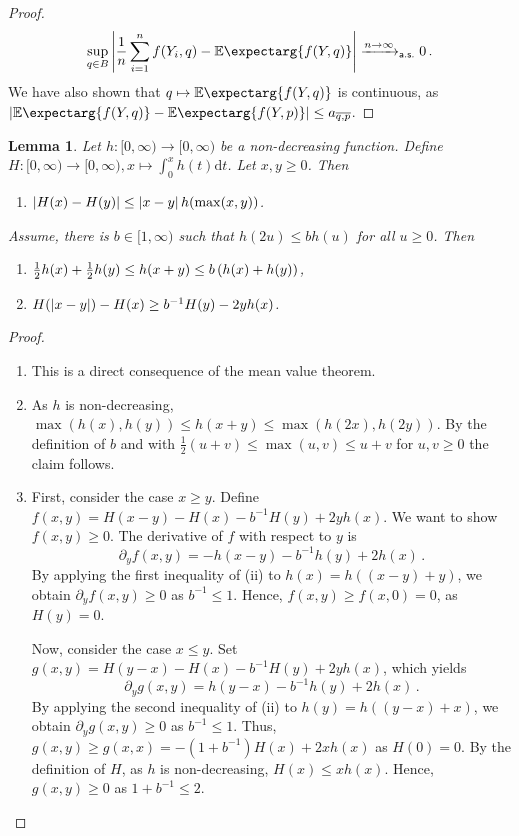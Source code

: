 \documentclass{scrartcl}
\newcommand{\Ex}{\E\expectarg}
\newcommand*{\ms}[1]{\mathsf{#1}}
\newcommand{\dl}{\mathrm{d}}
\newcommand{\equationFullstop}{\, .}
\newcommand{\eqfs}{\equationFullstop}
\newcommand{\sol}[2]{\overline{#1,#2}}
\theoremstyle{plain}\newtheorem{theorem}{Theorem}[section]
\newtheorem{lemma}[theorem]{Lemma}
\theoremstyle{definition}
\theoremstyle{remark}
\providecommand{\DIFaddtex}[1]{{\protect\color{blue}\uwave{#1}}} %
\providecommand{\DIFdeltex}[1]{{\protect\color{red}\sout{#1}}}                      %
\providecommand{\DIFaddbegin}{} %
\providecommand{\DIFaddend}{} %
\providecommand{\DIFdelbegin}{} %
\providecommand{\DIFdelend}{} %
\providecommand{\DIFadd}[1]{\texorpdfstring{\DIFaddtex{#1}}{#1}} %
\providecommand{\DIFdel}[1]{\texorpdfstring{\DIFdeltex{#1}}{}} %
\newcommand{\DIFscaledelfig}{0.5}
\newlength{\DIFdelgraphicswidth} %
\newlength{\DIFdelgraphicsheight} %
\newcommand{\DIFaddincludegraphics}[2][]{{\color{blue}\fbox{\DIFOincludegraphics[#1]{#2}}}} %
\newcommand{\DIFdelincludegraphics}[2][]{%
\sbox{\DIFdelgraphicsbox}{\DIFOincludegraphics[#1]{#2}}%
\settoboxwidth{\DIFdelgraphicswidth}{\DIFdelgraphicsbox} %
\settoboxtotalheight{\DIFdelgraphicsheight}{\DIFdelgraphicsbox} %
\scalebox{\DIFscaledelfig}{%
\parbox[b]{\DIFdelgraphicswidth}{\usebox{\DIFdelgraphicsbox}\\[-\baselineskip] \rule{\DIFdelgraphicswidth}{0em}}\llap{\resizebox{\DIFdelgraphicswidth}{\DIFdelgraphicsheight}{%
\setlength{\unitlength}{\DIFdelgraphicswidth}%
\begin{picture}(1,1)%
\thicklines\linethickness{2pt} %
{\color[rgb]{1,0,0}\put(0,0){\framebox(1,1){}}}%
{\color[rgb]{1,0,0}\put(0,0){\line( 1,1){1}}}%
{\color[rgb]{1,0,0}\put(0,1){\line(1,-1){1}}}%
\end{picture}%
}\hspace*{3pt}}} %
} %
\DeclareRobustCommand{\DIFaddbegin}{\DIFOaddbegin \let\includegraphics\DIFaddincludegraphics} %
\DeclareRobustCommand{\DIFaddend}{\DIFOaddend \let\includegraphics\DIFOincludegraphics} %
\DeclareRobustCommand{\DIFdelbegin}{\DIFOdelbegin \let\includegraphics\DIFdelincludegraphics} %
\DeclareRobustCommand{\DIFdelend}{\DIFOaddend \let\includegraphics\DIFOincludegraphics} %
\begin{document}
\begin{appendix}
\begin{proof}
\begin{equation*}
 \sup_{q\in B} \abs{\frac{1}n \sum_{i=1}^n f(Y_i, q) - \Ex{f(Y, q)}} \xrightarrow{n \to \infty}_{\ms{a.s.}} 0
 \eqfs
\end{equation*}
We have also shown that $q\mapsto \Ex{f(Y, q)}$ is continuous, as $\abs{\Ex{f(Y, q)}-\Ex{f(Y, p)}} \leq a_{\sol qp}$.
\end{proof}
 \begin{lemma}\label{lmm:nondec}
Let $h \colon [0,\infty) \to [0,\infty)$ be a non-decreasing function.
Define $H \colon [0,\infty) \to [0,\infty), x\mapsto \int_0^x h(t) \dl t$.
Let $x, y \geq 0$. Then
\begin{enumerate}[label=(\roman*)]
\item $\left| H(x) - H(y) \right| \leq \left| x-y \right|h(\max(x, y))$.
\end{enumerate}
Assume, there is $b \in [1,\infty)$ such that $h(2u) \leq b h(u)$ for all $u \geq 0$. Then
\begin{enumerate}[label=(\roman*),start=2]
\item $\frac{1}{2} h(x) + \frac{1}{2} h(y) \leq h (x+y) \leq b \left( h(x) + h(y) \right)$,
\item $H(\left| x-y \right|) - H(x) \geq b^{-1} H(y) - 2 y h(x)$.
\end{enumerate}
\end{lemma}
\begin{proof}
\begin{enumerate}[label=(\roman*)]
\item This is a direct consequence of the mean value theorem.
\item As $h$ is non-decreasing, $\max(h(x), h(y)) \leq h(x+y) \leq \max(h(2x), h(2y))$.
	By the definition of $b$ and with $\frac{1}{2}(u+v) \leq \max(u,v) \leq u+v$ for $u,v \geq 0$ the claim follows.
\item 
	First, consider the case $x\geq y$.
 	Define $f(x,y) = H(x-y)-H(x)- b^{-1} H(y) + 2 y h(x)$.
 	We want to show $f(x, y)\geq0$.
	The derivative of $f$ with respect to $y$ is 
	\begin{equation*}
		\partial_y f(x, y) = -h(x-y) - b^{-1}h(y) + 2 h(x)\eqfs
	\end{equation*} 
	By applying the first inequality of (ii) to $h(x) = h((x-y) + y)$, we obtain $\partial_y f(x, y)  \geq 0$ as $b^{-1} \leq 1$.
	Hence, $f(x, y) \geq f(x, 0) = 0$, as \DIFdelbegin \DIFdel{$H(y) = 0$}\DIFdelend \DIFaddbegin \DIFadd{$H(0) = 0$}\DIFaddend .

	Now, consider the case $x \leq y$. Set $g(x,y) = H(y-x) - H(x) - b^{-1} H(y) + 2 y h(x)$, which yields
	\begin{equation*}
		\partial_y g(x, y) = h(y-x) - b^{-1} h(y) + 2 h(x)\eqfs
	\end{equation*} 
	By applying the second inequality of (ii) to $h(y) = h((y-x) + x)$, we obtain $\partial_y g(x, y)  \geq 0$ as $b^{-1} \leq 1$.
	Thus, $g(x, y) \geq g(x, x) = -(1 + b^{-1}) H(x) + 2 x h(x)$ as $H(0) = 0$.
	By the definition of $H$, as $h$ is non-decreasing, $H(x) \leq x h(x)$. Hence, $g(x, y) \geq 0$ as $1 + b^{-1} \leq 2$.


\end{enumerate}
\end{proof}
\end{appendix}
\end{document}
